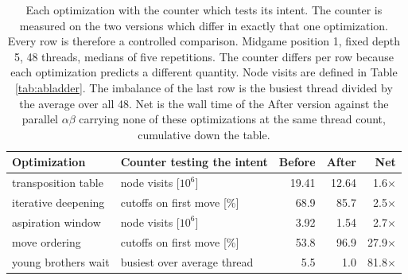 \begin{table}[htbp]
\centering
\footnotesize
\setlength{\tabcolsep}{5pt}
\caption{Each optimization with the counter which tests its intent. The counter is measured on the two versions which differ in exactly that one optimization. Every row is therefore a controlled comparison. Midgame position 1, fixed depth 5, 48 threads, medians of five repetitions. The counter differs per row because each optimization predicts a different quantity. Node visits are defined in Table \ref{tab:abladder}. The imbalance of the last row is the busiest thread divided by the average over all 48. Net is the wall time of the After version against the parallel $\alpha\beta$ carrying none of these optimizations at the same thread count, cumulative down the table.}
\label{tab:abintent}
\begin{tabular}{@{}llrrr@{}}
\toprule
Optimization & Counter testing the intent & Before & After & Net \\
\midrule
transposition table & node visits [$10^6$] & 19.41 & 12.64 & 1.6$\times$ \\
iterative deepening & cutoffs on first move [\%] & 68.9 & 85.7 & 2.5$\times$ \\
aspiration window & node visits [$10^6$] & 3.92 & 1.54 & 2.7$\times$ \\
move ordering & cutoffs on first move [\%] & 53.8 & 96.9 & 27.9$\times$ \\
young brothers wait & busiest over average thread & 5.5 & 1.0 & 81.8$\times$ \\
\bottomrule
\end{tabular}
\end{table}
